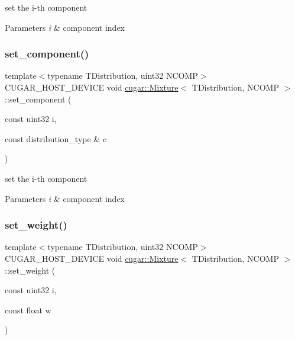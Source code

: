 set the i-\/th component


\begin{DoxyParams}{Parameters}
{\em i} & component index \\
\hline
\end{DoxyParams}
\mbox{\label{structcugar_1_1_mixture_abc1a088191870c698dc314d72a405914}} 
\subsubsection{\texorpdfstring{set\+\_\+component()}{set\_component()}\hspace{0.1cm}{\footnotesize\ttfamily [2/2]}}
{\footnotesize\ttfamily template$<$typename T\+Distribution, uint32 N\+C\+O\+MP$>$ \\
C\+U\+G\+A\+R\+\_\+\+H\+O\+S\+T\+\_\+\+D\+E\+V\+I\+CE void \hyperlink{structcugar_1_1_mixture}{cugar\+::\+Mixture}$<$ T\+Distribution, N\+C\+O\+MP $>$\+::set\+\_\+component (\begin{DoxyParamCaption}\item[{const uint32}]{i,  }\item[{const distribution\+\_\+type \&}]{c }\end{DoxyParamCaption})\hspace{0.3cm}{\ttfamily [inline]}}

set the i-\/th component


\begin{DoxyParams}{Parameters}
{\em i} & component index \\
\hline
\end{DoxyParams}
\mbox{\label{structcugar_1_1_mixture_a534c401940e7eb7478eb96107d09a300}} 
\subsubsection{\texorpdfstring{set\+\_\+weight()}{set\_weight()}}
{\footnotesize\ttfamily template$<$typename T\+Distribution, uint32 N\+C\+O\+MP$>$ \\
C\+U\+G\+A\+R\+\_\+\+H\+O\+S\+T\+\_\+\+D\+E\+V\+I\+CE void \hyperlink{structcugar_1_1_mixture}{cugar\+::\+Mixture}$<$ T\+Distribution, N\+C\+O\+MP $>$\+::set\+\_\+weight (\begin{DoxyParamCaption}\item[{const uint32}]{i,  }\item[{const float}]{w }\end{DoxyParamCaption})\hspace{0.3cm}{\ttfamily [inline]}}

